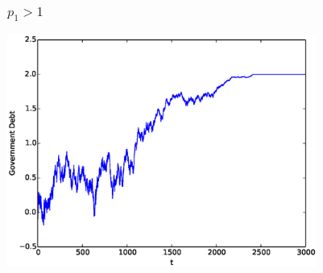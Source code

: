 \documentclass{beamer}
\begin{document}
 \begin{frame}

	\frametitle{$p_1 > 1$}
	\begin{center}
	\includegraphics[width=4in]{Images/port1.eps}
	\end{center}
\end{frame}
\end{document}
